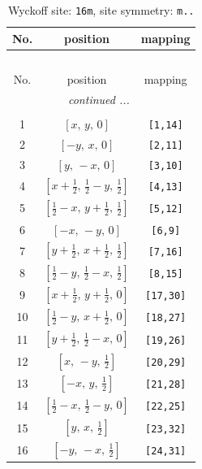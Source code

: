 \documentclass[fleqn,8pt]{jsarticle}
\begin{document}
\renewcommand{\arraystretch}{1.2}
\begin{longtable}{ccc}
\caption{Wyckoff site: {\tt 16m}, site symmetry: {\tt m..}}
 \\
 \hline \hline
No. & position & mapping \\ \hline \endfirsthead

\multicolumn{2}{l}{\tablename\ \thetable{}} \\
 \hline \hline
No. & position & mapping \\ \hline \endhead

 \hline \hline
\multicolumn{2}{r}{\footnotesize\it continued ...} \\ \endfoot

 \hline \hline
\multicolumn{2}{r}{} \\ \endlastfoot

1 & $\left[ x,\, y,\, 0 \right]$ & {\tt [1,14]} \\ \hline
2 & $\left[ - y,\, x,\, 0 \right]$ & {\tt [2,11]} \\ \hline
3 & $\left[ y,\, - x,\, 0 \right]$ & {\tt [3,10]} \\ \hline
4 & $\left[ x + \frac{1}{2},\, \frac{1}{2} - y,\, \frac{1}{2} \right]$ & {\tt [4,13]} \\ \hline
5 & $\left[ \frac{1}{2} - x,\, y + \frac{1}{2},\, \frac{1}{2} \right]$ & {\tt [5,12]} \\ \hline
6 & $\left[ - x,\, - y,\, 0 \right]$ & {\tt [6,9]} \\ \hline
7 & $\left[ y + \frac{1}{2},\, x + \frac{1}{2},\, \frac{1}{2} \right]$ & {\tt [7,16]} \\ \hline
8 & $\left[ \frac{1}{2} - y,\, \frac{1}{2} - x,\, \frac{1}{2} \right]$ & {\tt [8,15]} \\ \hline
9 & $\left[ x + \frac{1}{2},\, y + \frac{1}{2},\, 0 \right]$ & {\tt [17,30]} \\ \hline
10 & $\left[ \frac{1}{2} - y,\, x + \frac{1}{2},\, 0 \right]$ & {\tt [18,27]} \\ \hline
11 & $\left[ y + \frac{1}{2},\, \frac{1}{2} - x,\, 0 \right]$ & {\tt [19,26]} \\ \hline
12 & $\left[ x,\, - y,\, \frac{1}{2} \right]$ & {\tt [20,29]} \\ \hline
13 & $\left[ - x,\, y,\, \frac{1}{2} \right]$ & {\tt [21,28]} \\ \hline
14 & $\left[ \frac{1}{2} - x,\, \frac{1}{2} - y,\, 0 \right]$ & {\tt [22,25]} \\ \hline
15 & $\left[ y,\, x,\, \frac{1}{2} \right]$ & {\tt [23,32]} \\ \hline
16 & $\left[ - y,\, - x,\, \frac{1}{2} \right]$ & {\tt [24,31]} \\
\end{longtable}
\end{document}
